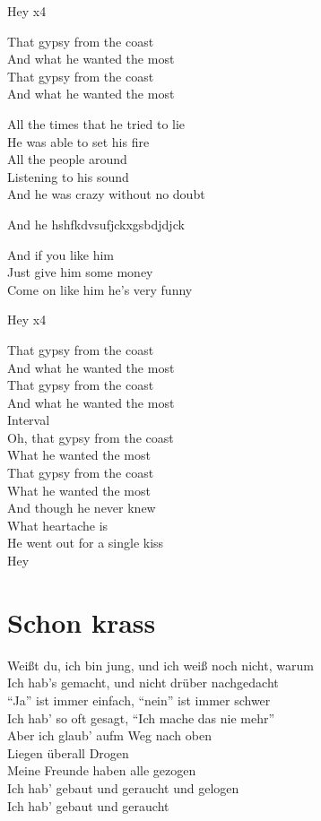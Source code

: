 \documentclass[]{book}
\begin{document}
Hey x4

That gypsy from the coast\\
And what he wanted the most\\
That gypsy from the coast\\
And what he wanted the most

All the times that he tried to lie\\
He was able to set his fire\\
All the people around\\
Listening to his sound\\
And he was crazy without no doubt

And he hshfkdvsufjckxgsbdjdjck

And if you like him\\
Just give him some money\\
Come on like him he's very funny

Hey x4

That gypsy from the coast\\
And what he wanted the most\\
That gypsy from the coast\\
And what he wanted the most\\
Interval\\
Oh, that gypsy from the coast\\
What he wanted the most\\
That gypsy from the coast\\
What he wanted the most\\
And though he never knew\\
What heartache is\\
He went out for a single kiss\\
Hey

\hypertarget{schon-krass-1}{%
\section{Schon krass}\label{schon-krass-1}}

Weißt du, ich bin jung, und ich weiß noch nicht, warum\\
Ich hab's gemacht, und nicht drüber nachgedacht\\
``Ja'' ist immer einfach, ``nein'' ist immer schwer\\
Ich hab' so oft gesagt, ``Ich mache das nie mehr''\\
Aber ich glaub' aufm Weg nach oben\\
Liegen überall Drogen\\
Meine Freunde haben alle gezogen\\
Ich hab' gebaut und geraucht und gelogen\\
Ich hab' gebaut und geraucht
\end{document}
